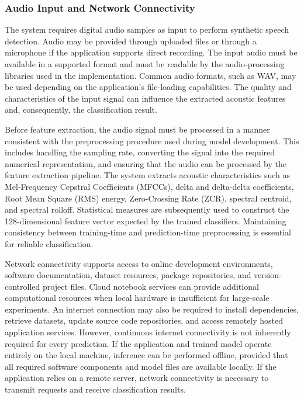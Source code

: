 \documentclass[12pt,a4paper]{report}
\begin{document}
\subsubsection{Audio Input and Network Connectivity}

The system requires digital audio samples as input to perform synthetic speech detection. Audio may be provided through uploaded files or through a microphone if the application supports direct recording. The input audio must be available in a supported format and must be readable by the audio-processing libraries used in the implementation. Common audio formats, such as WAV, may be used depending on the application's file-loading capabilities. The quality and characteristics of the input signal can influence the extracted acoustic features and, consequently, the classification result.

Before feature extraction, the audio signal must be processed in a manner consistent with the preprocessing procedure used during model development. This includes handling the sampling rate, converting the signal into the required numerical representation, and ensuring that the audio can be processed by the feature extraction pipeline. The system extracts acoustic characteristics such as Mel-Frequency Cepstral Coefficients (MFCCs), delta and delta-delta coefficients, Root Mean Square (RMS) energy, Zero-Crossing Rate (ZCR), spectral centroid, and spectral rolloff. Statistical measures are subsequently used to construct the 128-dimensional feature vector expected by the trained classifiers. Maintaining consistency between training-time and prediction-time preprocessing is essential for reliable classification.

Network connectivity supports access to online development environments, software documentation, dataset resources, package repositories, and version-controlled project files. Cloud notebook services can provide additional computational resources when local hardware is insufficient for large-scale experiments. An internet connection may also be required to install dependencies, retrieve datasets, update source code repositories, and access remotely hosted application services. However, continuous internet connectivity is not inherently required for every prediction. If the application and trained model operate entirely on the local machine, inference can be performed offline, provided that all required software components and model files are available locally. If the application relies on a remote server, network connectivity is necessary to transmit requests and receive classification results.
\end{document}
